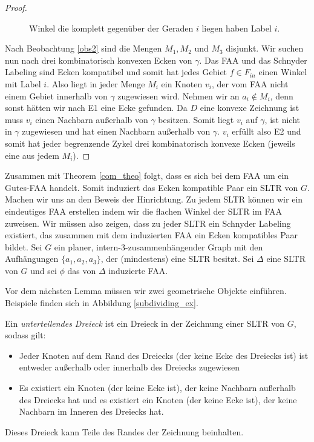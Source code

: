 \begin{proof}
\begin{figure}
\begin{minipage}{0.45\textwidth}
    \caption{Winkel die komplett gegenüber der Geraden $i$ liegen haben Label $i$.}
    \label{sweeplines2}
  \end{minipage}
\end{figure}
\captionsetup{format=plain,labelsep=endash,justification=raggedright,width=1\textwidth}

Nach Beobachtung \ref{obs2} sind die Mengen $M_1,M_2$ und $M_3$ disjunkt. Wir suchen nun nach drei kombinatorisch konvexen Ecken von $\gamma$. Das FAA und das Schnyder Labeling sind Ecken kompatibel und somit hat jedes Gebiet $f \in F_{in}$ einen Winkel mit Label $i$. Also liegt in jeder Menge $M_i$ ein Knoten $v_i$, der vom FAA nicht einem Gebiet innerhalb von $\gamma$ zugewiesen wird. Nehmen wir an $a_i \notin M_i$, denn sonst hätten wir nach E1 eine Ecke gefunden. Da $D$ eine konvexe Zeichnung ist muss $v_i$ einen Nachbarn außerhalb von $\gamma$ besitzen. Somit liegt $v_i$ auf $\gamma$, ist nicht in $\gamma$ zugewiesen und hat einen Nachbarn außerhalb von $\gamma$. $v_i$ erfüllt also E2 und somit hat jeder begrenzende Zykel drei kombinatorisch konvexe Ecken (jeweils eine aus jedem $M_i$).
\end{proof}

Zusammen mit Theorem \ref{com_theo} folgt, dass es sich bei dem FAA um ein Gutes-FAA handelt. Somit induziert das Ecken kompatible Paar ein SLTR von $G$.\\

Machen wir uns an den Beweis der Hinrichtung. Zu jedem SLTR können wir ein eindeutiges FAA erstellen indem wir die flachen Winkel der SLTR im FAA zuweisen. Wir müssen also zeigen, dass zu jeder SLTR ein Schnyder Labeling existiert, das zusammen mit dem induzierten FAA ein Ecken kompatibles Paar bildet. Sei $G$ ein planer, intern-3-zusammenhängender Graph mit den Aufhängungen $\{a_1,a_2,a_3\}$, der (mindestens) eine SLTR besitzt. Sei $\Delta$ eine SLTR von $G$ und sei $\phi$ das von $\Delta$ induzierte FAA.

Vor dem nächsten Lemma müssen wir zwei geometrische Objekte einführen. Beispiele finden sich in Abbildung \ref{subdividing_ex}.

\begin{definition}
Ein \textit{unterteilendes Dreieck} ist ein Dreieck in der Zeichnung einer SLTR von $G$, sodass gilt:
\begin{itemize}
\item Jeder Knoten auf dem Rand des Dreiecks (der keine Ecke des Dreiecks ist) ist entweder außerhalb oder innerhalb des Dreiecks zugewiesen
\item Es existiert ein Knoten (der keine Ecke ist), der keine Nachbarn außerhalb des Dreiecks hat und es existiert ein Knoten (der keine Ecke ist), der keine Nachbarn im Inneren des Dreiecks hat.
\end{itemize}
Dieses Dreieck kann Teile des Randes der Zeichnung beinhalten.
\end{definition}

